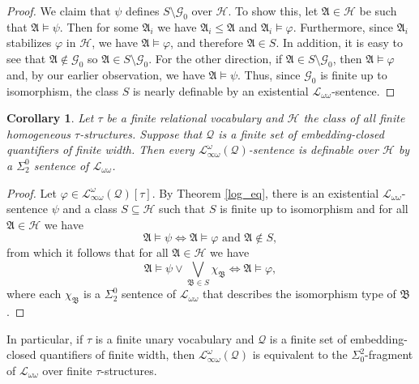 \documentclass{ndjflart}
\theoremstyle{plain}
\newtheorem{corollary}[conjecture]{Corollary}
\theoremstyle{definition}
\numberwithin{equation}{section}
\begin{document}
\begin{proof}
We claim that $\psi$ defines $S \setminus \mathcal{G}_0$ over $\mathcal{H}$.
To show this, let $\mathfrak{A} \in \mathcal{H}$ be such that
$\mathfrak{A} \vDash \psi$.
Then for some $\mathfrak{A}_i$ we have $\mathfrak{A}_i \leq \mathfrak{A}$ and
$\mathfrak{A}_i \vDash \varphi$.
Furthermore, since $\mathfrak{A}_i$ stabilizes $\varphi$ in $\mathcal{H}$, we
have $\mathfrak{A} \vDash \varphi$, and therefore $\mathfrak{A} \in S$.
In addition, it is easy to see that $\mathfrak{A} \notin \mathcal{G}_0$ so
$\mathfrak{A} \in S \setminus \mathcal{G}_0$.
For the other direction, if $\mathfrak{A} \in S \setminus \mathcal{G}_0$,
then $\mathfrak{A} \vDash \varphi$ and, by our earlier observation, we have
$\mathfrak{A} \vDash \psi$.
Thus, since $\mathcal{G}_0$ is finite up to isomorphism, the class $S$ is nearly
definable by an existential $\mathcal{L}_{\omega\omega}$-sentence.
\end{proof}

\begin{corollary}
Let $\tau$ be a finite relational vocabulary and $\mathcal{H}$ the class of all
finite homogeneous $\tau$-structures.
Suppose that $\mathcal{Q}$ is a finite set of embedding-closed quantifiers of
finite width.
Then every $\mathcal{L}^{\omega}_{\infty\omega}(\mathcal{Q})$-sentence is
definable over $\mathcal{H}$ by a $\Sigma^0_2$ sentence of
$\mathcal{L}_{\omega\omega}$.
\end{corollary}
\begin{proof}
Let $\varphi \in \mathcal{L}^{\omega}_{\infty\omega}(\mathcal{Q})[\tau]$.
By Theorem \ref{log_eq}, there is an existential
$\mathcal{L}_{\omega\omega}$-sentence $\psi$ and a class
$S \subseteq \mathcal{H}$ such that $S$ is finite up to isomorphism and for all
$\mathfrak{A} \in \mathcal{H}$ we have
\[
	\mathfrak{A} \vDash \psi 
	\Leftrightarrow \mathfrak{A} \vDash \varphi \text{ and } \mathfrak{A} \notin S,
\]
from which it follows that for all $\mathfrak{A} \in \mathcal{H}$ we have
\[
	\mathfrak{A} \vDash \psi \vee \bigvee_{\mathfrak{B} \in S} \chi_{\mathfrak{B}} 
	\Leftrightarrow \mathfrak{A} \vDash \varphi,
\]
where each $\chi_{\mathfrak{B}}$ is a $\Sigma_2^0$ sentence of
$\mathcal{L}_{\omega \omega}$ that describes the isomorphism type of $\mathfrak{B}$.
\end{proof}

In particular, if $\tau$ is a finite unary vocabulary and $\mathcal{Q}$ is a
finite set of embedding-closed quantifiers of finite width, then
$\mathcal{L}_{\infty\omega}^{\omega}(\mathcal{Q})$ is equivalent to the
$\Sigma_0^2$-fragment of $\mathcal{L}_{\omega\omega}$ over finite $\tau$-structures.
\end{document}
